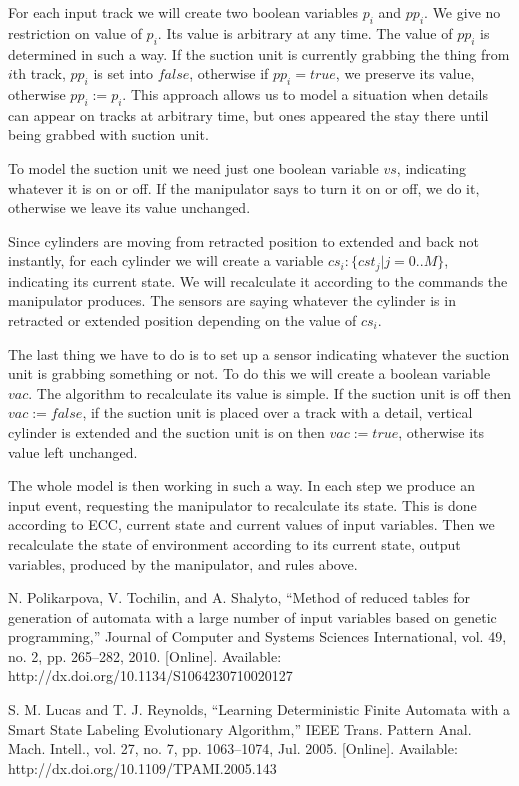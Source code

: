 \documentclass[fleqn,twocolumn]{article}
\begin{document}
For each input track we will create two boolean variables $p_i$ and $pp_i$. We give no restriction on value of $p_i$. Its value is arbitrary at any time.
The value of $pp_i$ is determined in such a way. If the suction unit is currently grabbing the thing from $i$th track, $pp_i$ is set into $false$, otherwise
if $pp_i = true$, we preserve its value, otherwise $pp_i := p_i$. This approach allows us to model a situation when details can appear on tracks at arbitrary
time, but ones appeared the stay there until being grabbed with suction unit.

To model the suction unit we need just one boolean variable $vs$, indicating whatever it is on or off. If the manipulator says to turn it on or off, we do it,
otherwise we leave its value unchanged.

Since cylinders are moving from retracted position to extended and back not instantly, for each cylinder we will create a variable $cs_i : \{ cst_j | j = 0 .. M \}$,
indicating its current state. We will recalculate it according to the commands the manipulator produces. The sensors are saying whatever the cylinder is in
retracted or extended position depending on the value of $cs_i$.

The last thing we have to do is to set up a sensor indicating whatever the suction unit is grabbing something or not. To do this we will create a boolean
variable $vac$. The algorithm to recalculate its value is simple. If the suction unit is off then $vac := false$, if the suction unit is placed over a
track with a detail, vertical cylinder is extended and the suction unit is on then $vac := true$, otherwise its value left unchanged.

The whole model is then working in such a way. In each step we produce an input event, requesting the manipulator to recalculate its state. This is done
according to ECC, current state and current values of input variables. Then we recalculate the state of environment according to its current state,
output variables, produced by the manipulator, and rules above.

\begin{thebibliography}{2}

N. Polikarpova, V. Tochilin, and A. Shalyto, “Method of reduced tables for generation of automata with a large number of input variables
based on genetic programming,” Journal of Computer and Systems Sciences International, vol. 49, no. 2, pp. 265–282, 2010. [Online].
Available: http://dx.doi.org/10.1134/S1064230710020127

S. M. Lucas and T. J. Reynolds, “Learning Deterministic Finite Automata with a Smart State Labeling Evolutionary Algorithm,” IEEE
Trans. Pattern Anal. Mach. Intell., vol. 27, no. 7, pp. 1063–1074, Jul. 2005. [Online]. Available: http://dx.doi.org/10.1109/TPAMI.2005.143

\end{thebibliography}
\end{document}
